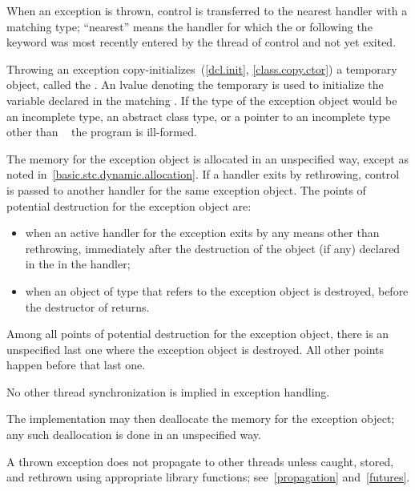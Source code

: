 \pnum
{}%
%
%
When an exception is thrown, control is transferred to the nearest handler with
a matching type; ``nearest'' means the handler
for which the
 or
following the
keyword was most recently entered by the thread of control and not yet exited.

\pnum
Throwing an exception
copy-initializes~(\ref{dcl.init}, \ref{class.copy.ctor}) a temporary object,
called the
.
An lvalue denoting the temporary is used to initialize the
variable declared in the matching
.
If the type of the exception object would be
an incomplete type,
an abstract class type,
or a pointer to an incomplete type other than \cv{}~
the program is ill-formed.

\pnum
{}%
%
%
The memory for the exception object is
allocated in an unspecified way, except as noted in~\ref{basic.stc.dynamic.allocation}.
If a handler exits by rethrowing, control is passed to another handler for
the same exception object.
The points of potential destruction for the exception object are:

\begin{itemize}
\item
when an active handler for the exception exits by
any means other than
rethrowing,
immediately after the destruction of the object (if any)
declared in the  in the handler;

\item
when an object of type 
that refers to the exception object is destroyed,
before the destructor of  returns.
\end{itemize}

Among all points of potential destruction for the exception object,
there is an unspecified last one
where the exception object is destroyed.
All other points happen before that last one.
\begin{note}
No other thread synchronization is implied in exception handling.
\end{note}
The implementation may then
deallocate the memory for the exception object; any such deallocation
is done in an unspecified way.
\begin{note} A thrown exception does not
propagate to other threads unless caught, stored, and rethrown using
appropriate library functions; see~\ref{propagation} and~\ref{futures}. \end{note}

